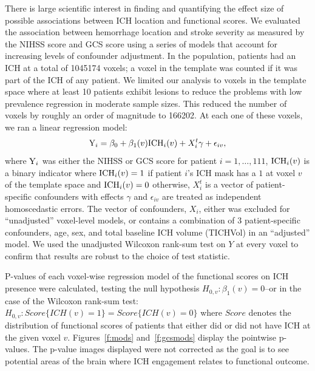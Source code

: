 \documentclass[10pt]{article}\usepackage[]{graphicx}\usepackage[]{color}
\begin{document}
There is large scientific interest in finding and quantifying the effect size of possible associations between ICH location and functional scores.  We evaluated the association between hemorrhage location and stroke severity as measured by the NIHSS score and GCS score using a series of models that account for increasing levels of confounder adjustment.  In the population, patients had an ICH at a total of 1045174 voxels; a voxel in the template was counted if it was part of the ICH of any patient.  We limited our analysis to voxels in the template space where at least 10 patients exhibit lesions to reduce the problems with low prevalence regression in moderate sample sizes.
This reduced the number of voxels by roughly an order of magnitude to 166202. At each one of these voxels, we ran a linear regression model:
\begin{equation}\label{eq:nihss_regression}
{\rm Y}_i=\beta_0+\beta_1(v) {\rm ICH}_i(v)+X^t_i \gamma + \epsilon_{iv}, 
\end{equation}
where ${\rm Y}_i$ was either the NIHSS or GCS score for patient $i=1,\ldots,111$, ${\rm ICH}_i(v)$ is a binary indicator where ${\rm ICH}_i(v) = 1$ if patient $i$'s ICH mask has a $1$ at voxel $v$ of the template space and ${\rm ICH}_i(v) = 0$ otherwise, $X^t_i$ is a vector of patient-specific confounders with effects $\gamma$ and $\epsilon_{iv}$ are treated as independent homoscedastic errors.  The vector of confounders, $X_i$, either was excluded for ``unadjusted'' voxel-level models, or contains a combination of $3$ patient-specific confounders, age, sex, and total baseline ICH volume (TICHVol) in an ``adjusted'' model.  We used the unadjusted Wilcoxon rank-sum test on $Y$ at every voxel to confirm that results are robust to the choice of test statistic.


P-values of each voxel-wise regression model of the functional scores on ICH presence were calculated, testing the null hypothesis $H_{0,v}:\beta_1(v)=0$--or in the case of the Wilcoxon rank-sum test: $H_{0,v}: Score\{ICH(v) = 1\} = Score\{ICH(v) = 0\}$ where $Score$ denotes the distribution of functional scores of patients that either did or did not have ICH at the given voxel $v$.  Figures~\ref{f:mods} and~\ref{f:gcsmods} display the pointwise p-values.  The p-value images displayed were not corrected as the goal is to see potential areas of the brain where ICH engagement relates to functional outcome.
\end{document}
